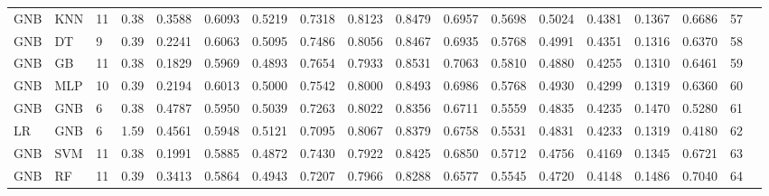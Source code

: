 \begin{table}[H]
{\begin{tabular}{|p{1.3cm}|p{1.2cm}|p{1.4cm}|r|c|c|c|c|c|c|c|c|c|c|c|c|c|c|}
GNB & KNN & 11 & 0.38 & 0.3588 & 0.6093 & 0.5219 & 0.7318 & 0.8123 & 0.8479 & 0.6957 & 0.5698 & 0.5024 & 0.4381 & 0.1367  & 0.6686 & 57 \\
GNB & DT & 9 & 0.39 & 0.2241 & 0.6063 & 0.5095 & 0.7486 & 0.8056 & 0.8467 & 0.6935 & 0.5768 & 0.4991 & 0.4351 & 0.1316 &  0.6370 & 58 \\
GNB & GB & 11 & 0.38 & 0.1829 & 0.5969 & 0.4893 & 0.7654 & 0.7933 & 0.8531 & 0.7063 & 0.5810 & 0.4880 & 0.4255 & 0.1310  & 0.6461 & 59 \\
GNB & MLP & 10 & 0.39 & 0.2194 & 0.6013 & 0.5000 & 0.7542 & 0.8000 & 0.8493 & 0.6986 & 0.5768 & 0.4930 & 0.4299 & 0.1319  & 0.6360 & 60 \\
GNB & GNB & 6 & 0.38 & 0.4787 & 0.5950 & 0.5039 & 0.7263& 0.8022 & 0.8356 & 0.6711 & 0.5559 & 0.4835 & 0.4235 & 0.1470 &  0.5280 & 61 \\
LR & GNB & 6 & 1.59 & 0.4561 & 0.5948 & 0.5121 & 0.7095 & 0.8067 & 0.8379 & 0.6758 & 0.5531 & 0.4831 & 0.4233 & 0.1319  & 0.4180 & 62 \\
GNB & SVM & 11 & 0.38 & 0.1991 & 0.5885 & 0.4872 & 0.7430 & 0.7922 & 0.8425 & 0.6850 & 0.5712 & 0.4756 & 0.4169 & 0.1345  & 0.6721 & 63 \\
GNB & RF & 11 & 0.39 & 0.3413 & 0.5864 & 0.4943 & 0.7207 & 0.7966 & 0.8288 & 0.6577 & 0.5545 & 0.4720 & 0.4148 & 0.1486 &  0.7040 & 64 \\
    \hline
    \bottomrule 
\end{tabular}}
\vspace{1em}

\vspace{-1em}
\end{table}

\clearpage
\newpage
{}
\restoregeometry
\fancyheadoffset{0pt}

